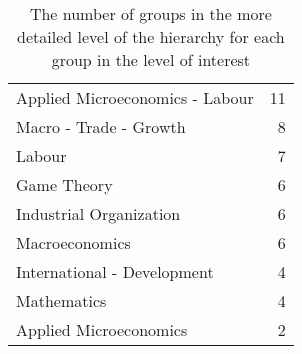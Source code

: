 \begin{table}[tb]
\centering
\caption[Subgroups]{The number of groups in the more detailed level of the hierarchy for each group in the level of interest}
\label{tab:subgroups}
\begin{tabular}{lr}
\toprule
Applied Microeconomics - Labour &  11 \\
Macro - Trade - Growth          &   8 \\
Labour                          &   7 \\
Game Theory                     &   6 \\
Industrial Organization         &   6 \\
Macroeconomics                  &   6 \\
International - Development     &   4 \\
Mathematics                     &   4 \\
Applied Microeconomics          &   2 \\
\bottomrule
\end{tabular}
\end{table}
